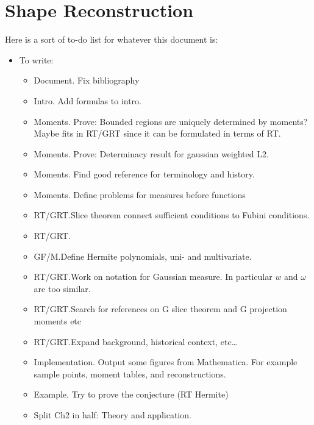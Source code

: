 


\section{Shape Reconstruction}
Here is a sort of to-do list for whatever this document is:
\begin{itemize}
    \item To write:
    \begin{itemize}
        \item Document. Fix bibliography
        \item Intro. Add formulas to intro.
        \item Moments. Prove: Bounded regions are uniquely determined by moments? Maybe fits in RT/GRT since it can be formulated in terms of RT.\@
        \item Moments. Prove: Determinacy result for gaussian weighted L2.
        \item Moments. Find good reference for terminology and history. 
        \item Moments. Define problems for measures before functions
        \item RT/GRT.\@ Slice theorem connect sufficient conditions to Fubini conditions.
        \item RT/GRT. \@ 
        \item GF/M.\@ Define Hermite polynomials, uni- and multivariate.
        \item RT/GRT.\@ Work on notation for Gaussian measure. In particular $w$ and $\omega$ are too similar. 
        \item RT/GRT.\@ Search for references on G slice theorem and G projection moments etc
        \item RT/GRT.\@ Expand background, historical context, etc\ldots
        \item Implementation. Output some figures from Mathematica. For example sample points, moment tables, and reconstructions.
        \item Example. Try to prove the conjecture (RT Hermite)
        \item Split Ch2 in half: Theory and application.
    \end{itemize}


\end{itemize}
